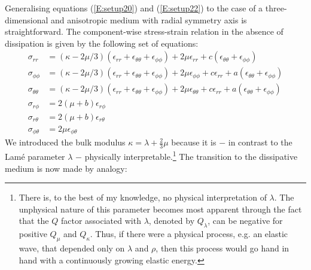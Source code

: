 Generalising equations (\ref{E:setup20}) and (\ref{E:setup22}) to
the case of a three-dimensional and anisotropic medium with radial
symmetry axis is straightforward. The component-wise stress-strain
relation in the absence of dissipation is given by the following set
of equations:
\begin{subequations}\label{E:setup32}
\begin{align}
\sigma_{rr}&=(\kappa-2\mu/3)(\epsilon_{rr}+\epsilon_{\theta\theta}+\epsilon_{\phi\phi})+2\mu\epsilon_{rr}+c(\epsilon_{\theta\theta}+\epsilon_{\phi\phi})\\
\sigma_{\phi\phi}&=(\kappa-2\mu/3)(\epsilon_{rr}+\epsilon_{\theta\theta}+\epsilon_{\phi\phi})+2\mu\epsilon_{\phi\phi}+c\epsilon_{rr}+a(\epsilon_{\theta\theta}+\epsilon_{\phi\phi})\\
\sigma_{\theta\theta}&=(\kappa-2\mu/3)(\epsilon_{rr}+\epsilon_{\theta\theta}+\epsilon_{\phi\phi})+2\mu\epsilon_{\theta\theta}+c\epsilon_{rr}+a(\epsilon_{\theta\theta}+\epsilon_{\phi\phi})\\
\sigma_{r\phi}&=2(\mu+b)\epsilon_{r\phi}\\
\sigma_{r\theta}&=2(\mu+b)\epsilon_{r\theta}\\
\sigma_{\phi\theta}&=2\mu\epsilon_{\phi\theta}
\end{align}
\end{subequations}
We introduced the bulk modulus $\kappa=\lambda+\frac{2}{3}\mu$
because it is $-$ in contrast to the Lam\'{e} parameter $\lambda$ $-$
physically interpretable.\footnote{\textsf{There is, to the best of
my knowledge, no physical interpretation of $\lambda$. The
unphysical nature of this parameter becomes most apparent through
the fact that the $Q$ factor associated with $\lambda$, denoted by
$Q_\lambda$, can be negative for positive $Q_\mu$ and $Q_\kappa$.
Thus, if there were a physical process, e.g. an elastic wave, that
depended only on $\lambda$ and $\rho$, then this process would go
hand in hand with a continuously growing elastic energy.}} The
transition to the dissipative medium is now made by analogy:
